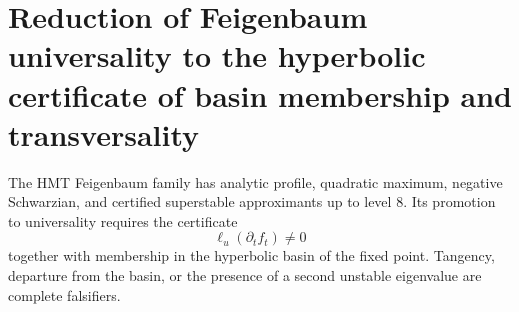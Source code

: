 \section{Reduction of Feigenbaum universality to the hyperbolic certificate of basin membership and transversality}
\label{sec:p3-final:cierre-feigenbaum}

The HMT Feigenbaum family has analytic profile, quadratic maximum,
negative Schwarzian, and certified superstable approximants up to level
\(8\). Its promotion to universality requires the certificate
\[
 \ell_u(\partial_t f_t)\ne0
\]
together with membership in the hyperbolic basin of the fixed point. Tangency,
departure from the basin, or the presence of a second unstable eigenvalue are
complete falsifiers.
